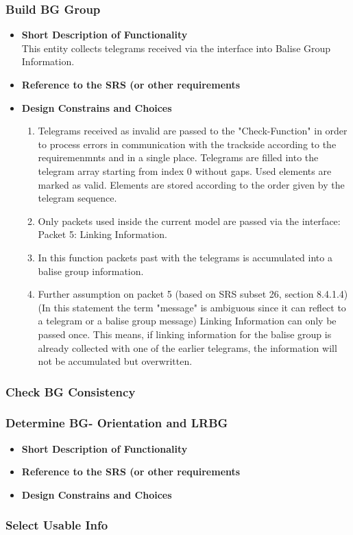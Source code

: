 \subsubsection{Build BG Group}
\begin{itemize}
\item \textbf{Short Description of Functionality}\\
This entity collects telegrams received via the interface into Balise Group Information.
\item \textbf{Reference to the SRS (or other requirements}\\
\item \textbf{Design Constrains and Choices}\\
\begin{enumerate}
\item Telegrams received as invalid are passed to the "Check-Function" in order to process errors in communication with the trackside according to the requiremenmnts and in a single place.
Telegrams are filled into the telegram array starting from index 0 without gaps. Used elements are marked as valid. Elements are stored according to the order given by the telegram sequence. 

\item Only packets used inside the current model are passed via the interface:\\
	Packet 5: Linking Information.\\
\item In this function packets past with the telegrams is accumulated into a balise group information.\\
\item Further assumption on packet 5 (based on SRS subset 26, section 8.4.1.4)\\
(In this statement the term "message" is ambiguous since it can reflect to a telegram or a balise group message)
	Linking Information can only be passed once. This means, if linking information for the balise group is already collected with one of the earlier telegrams, the information will not be accumulated but overwritten.\\

\end{enumerate}

\end{itemize}

\subsubsection{Check BG Consistency}

\subsubsection{Determine BG- Orientation and LRBG}
\begin{itemize}
\item \textbf{Short Description of Functionality}\\
\item \textbf{Reference to the SRS (or other requirements}\\
\item \textbf{Design Constrains and Choices}\\
\end{itemize}
			
\subsubsection{Select Usable Info}
